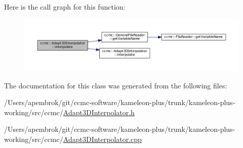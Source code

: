 Here is the call graph for this function\-:\nopagebreak
\begin{figure}[H]
\begin{center}
\leavevmode
\includegraphics[width=350pt]{classccmc_1_1_adapt3_d_interpolator_a62f9740d20678b993f2871c6505f7df3_cgraph}
\end{center}
\end{figure}




The documentation for this class was generated from the following files\-:\begin{DoxyCompactItemize}
\item 
/\-Users/apembrok/git/ccmc-\/software/kameleon-\/plus/trunk/kameleon-\/plus-\/working/src/ccmc/\hyperlink{_adapt3_d_interpolator_8h}{Adapt3\-D\-Interpolator.\-h}\item 
/\-Users/apembrok/git/ccmc-\/software/kameleon-\/plus/trunk/kameleon-\/plus-\/working/src/ccmc/\hyperlink{_adapt3_d_interpolator_8cpp}{Adapt3\-D\-Interpolator.\-cpp}\end{DoxyCompactItemize}
